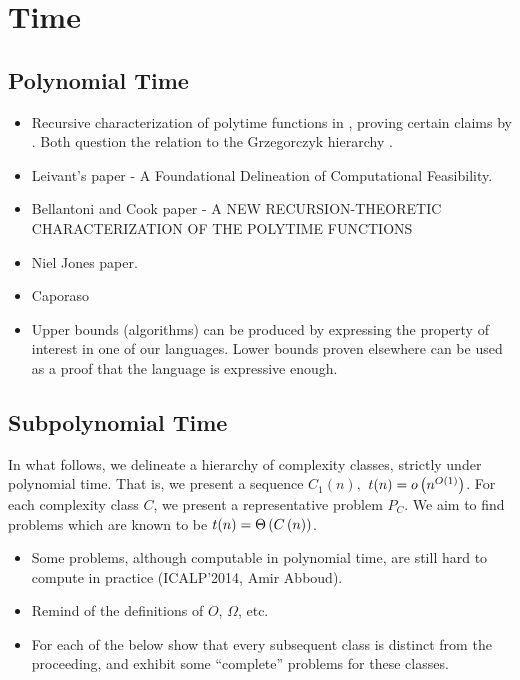 \section{Time}

\subsection{Polynomial Time}

\begin{itemize}

\item Recursive characterization of polytime functions in \cite{rose-1984},
proving certain claims by \cite{cobham-1965}. Both question the relation to the
Grzegorczyk hierarchy \cite{grzegorczyk-1953}.

\item Leivant's paper - A Foundational Delineation of Computational Feasibility.

\item Bellantoni and Cook paper - A NEW RECURSION-THEORETIC CHARACTERIZATION OF
THE POLYTIME FUNCTIONS

\item Niel Jones paper.

\item Caporaso

\item Upper bounds (algorithms) can be produced by expressing the property of
interest in one of our languages. Lower bounds proven elsewhere can be used as
a proof that the language is expressive enough.

\end{itemize}

\subsection{Subpolynomial Time}

In what follows, we delineate a hierarchy of complexity classes, strictly under
polynomial time. That is, we present a sequence $C_1(n),$ $t(n)=o\left({n^{O\left({1}\right)}}\right)$. For each
complexity class $C$, we present a representative problem $P_C$. We aim to find
problems which are known to be $t(n)=\Theta\left({C\left({n}\right)}\right)$.

\begin{itemize}

\item Some problems, although computable in polynomial time, are still hard to
compute in practice (ICALP'2014, Amir Abboud).

\item Remind of the definitions of $O$, $\Omega$, etc.

\item For each of the below show that every subsequent class is distinct from
the proceeding, and exhibit some ``complete'' problems for these classes.

\end{itemize}

